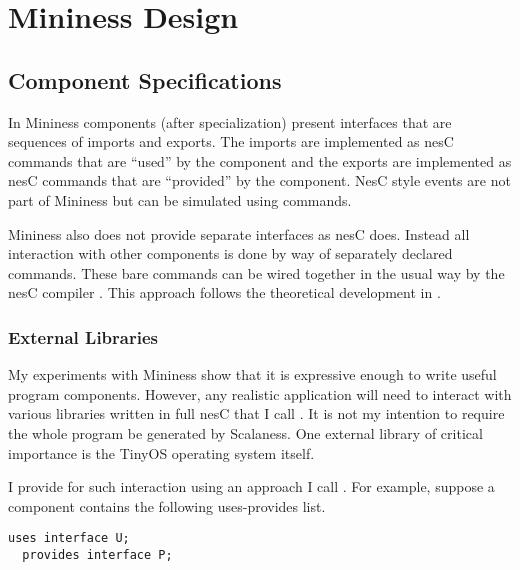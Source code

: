 
\chapter{Mininess Design}
\label{chap:mininess-design}

\section{Component Specifications}
\label{sec:component-specifications-design}

In Mininess components (after specialization) present interfaces that are sequences of imports
and exports. The imports are implemented as nesC commands that are ``used'' by the component and
the exports are implemented as nesC commands that are ``provided'' by the component. NesC style
events are not part of Mininess but can be simulated using commands.


Mininess also does not provide separate interfaces as nesC does. Instead all interaction with
other components is done by way of separately declared commands. These bare commands can be
wired together in the usual way by the nesC compiler \cite{Gay-nesC-2003}. This approach follows
the theoretical development in \cite{FramedML,nesT}.


\subsection{External Libraries}
\label{sec:external-libraries-design}

My experiments with Mininess show that it is expressive enough to write useful program
components. However, any realistic application will need to interact with various libraries
written in full nesC that I call . It is not my intention to require
the whole program be generated by Scalaness. One external library of critical importance is the
TinyOS operating system itself.

I provide for such interaction using an approach I call . For
example, suppose a component contains the following uses-provides list.

\singlespace
\vspace{1.0ex}
\begin{Verbatim}[fontsize=\small]
  uses interface U;
  provides interface P;
\end{Verbatim}
\vspace{1.0ex}
\primaryspacing

